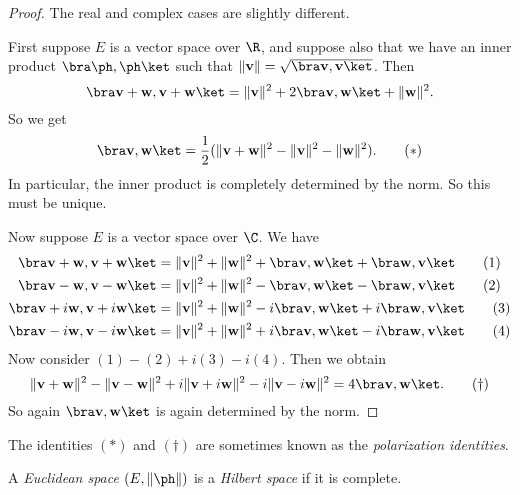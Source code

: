 \documentclass[a4paper]{article}
\begin{document}
\begin{proof}
  The real and complex cases are slightly different.

  First suppose $E$ is a vector space over $\R$, and suppose also that we have an inner product $\bra \ph,\ph\ket$ such that $\|\mathbf{v}\| = \sqrt{\bra \mathbf{v}, \mathbf{v}\ket }$. Then
  \[
    \bra \mathbf{v} + \mathbf{w}, \mathbf{v} + \mathbf{w}\ket = \|\mathbf{v}\|^2 + 2\bra \mathbf{v}, \mathbf{w}\ket + \|\mathbf{w}\|^2.
  \]
  So we get
  \[
    \bra \mathbf{v}, \mathbf{w}\ket = \frac{1}{2} (\|\mathbf{v} + \mathbf{w}\|^2 - \|\mathbf{v}\|^2 - \|\mathbf{w}\|^2).\tag{$*$}
  \]
  In particular, the inner product is completely determined by the norm. So this must be unique.

  Now suppose $E$ is a vector space over $\C$. We have
  \begin{align*}
    \bra \mathbf{v} + \mathbf{w}, \mathbf{v} + \mathbf{w}\ket &= \|\mathbf{v}\|^2 + \|\mathbf{w}\|^2 + \bra \mathbf{v}, \mathbf{w}\ket + \bra \mathbf{w}, \mathbf{v}\ket\tag{1}\\
    \bra \mathbf{v} - \mathbf{w}, \mathbf{v} - \mathbf{w}\ket &= \|\mathbf{v}\|^2 + \|\mathbf{w}\|^2 - \bra \mathbf{v}, \mathbf{w}\ket - \bra \mathbf{w}, \mathbf{v}\ket\tag{2}\\
    \bra \mathbf{v} +i\mathbf{w}, \mathbf{v} +i\mathbf{w}\ket &= \|\mathbf{v}\|^2 + \|\mathbf{w}\|^2 -i\bra \mathbf{v}, \mathbf{w}\ket +i\bra \mathbf{w}, \mathbf{v}\ket\tag{3}\\
    \bra \mathbf{v} -i\mathbf{w}, \mathbf{v} -i\mathbf{w}\ket &= \|\mathbf{v}\|^2 + \|\mathbf{w}\|^2 +i\bra \mathbf{v}, \mathbf{w}\ket -i\bra \mathbf{w}, \mathbf{v}\ket\tag{4}
  \end{align*}
  Now consider $(1) - (2) + i(3) - i(4)$. Then we obtain
  \[
    \|\mathbf{v} + \mathbf{w}\|^2 - \|\mathbf{v} - \mathbf{w}\|^2 + i\|\mathbf{v} + i\mathbf{w}\|^2 - i\|\mathbf{v} - i\mathbf{w}\|^2 = 4\bra \mathbf{v}, \mathbf{w}\ket.\tag{$\dagger$}
  \]
  So again $\bra \mathbf{v}, \mathbf{w}\ket$ is again determined by the norm.
\end{proof}
The identities $(*)$ and $(\dagger)$ are sometimes known as the \emph{polarization identities}.

\begin{defi}
  A \emph{Euclidean space} $(E, \|\ph\|)$ is a \emph{Hilbert space} if it is complete.
\end{defi}
\end{document}

